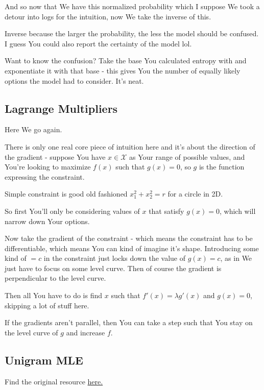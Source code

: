 \documentclass{article}
\begin{document}
			And so now that We have this normalized probability which I suppose We took a detour into logs for the intuition, now We take the inverse of this.
			
			Inverse because the larger the probability, the less the model should be confused. I guess You could also report the certainty of the model lol.
			
			Want to know the confusion? Take the base You calculated entropy with and exponentiate it with that base - this gives You the number of equally likely options the model had to consider. It's neat.
			
			
	\subsection{Lagrange Multipliers}
	
		Here We go again.
		
		There is only one real core piece of intuition here and it's about the direction of the gradient - suppose You have $x\in\mathcal{X}$ as Your range of possible values, and You're looking to maximize $f(x)$ such that $g(x) = 0$, so $g$ is the function expressing the constraint.
		
		Simple constraint is good old fashioned $x_1^2+x_2^2=r$ for a circle in 2D.
		
		So first You'll only be considering values of $x$ that satisfy $g(x)=0$, which will narrow down Your options.
		
		Now take the gradient of the constraint - which means the constraint has to be differentiable, which means You can kind of imagine it's shape. Introducing some kind of $=c$ in the constraint just locks down the value of $g(x)=c$, as in We just have to focus on some level curve. Then of course the gradient is perpendicular to the level curve.
		
		Then all You have to do is find $x$ such that $f'(x) = \lambda g'(x)$ and $g(x)=0$, skipping a lot of stuff here.
		
		If the gradients aren't parallel, then You can take a step such that You stay on the level curve of $g$ and increase $f$.
		
	\subsection{Unigram MLE}
	
		Find the original resource \href{https://leimao.github.io/blog/Maximum-Likelihood-Estimation-Ngram/}{here.}
		
\end{document}
